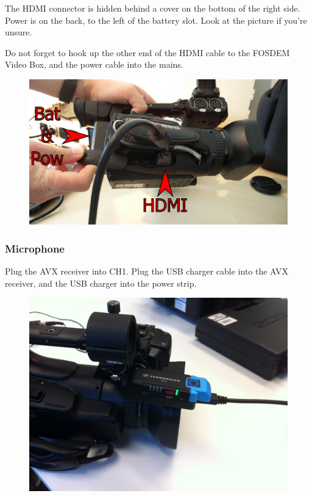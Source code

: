 \documentclass{article}
\begin{document}
The HDMI connector is hidden behind a cover on the bottom of the right side.
Power is on the back, to the left of the battery slot.
Look at the picture if you're unsure.

Do not forget to hook up the other end of the HDMI cable to the FOSDEM Video Box, and the power cable into the mains.

\begin{figure}[H]
  \centering
\includegraphics[width = 120mm]{Canon01.jpg}
\end{figure}

\subsubsection{Microphone}
Plug the AVX receiver into CH1. Plug the USB charger cable into the AVX receiver, and the USB charger into the power strip.

\begin{figure}[H]
  \centering
\includegraphics[width = 120mm]{canon_avx_receiver.jpg}
\end{figure}
\end{document}
